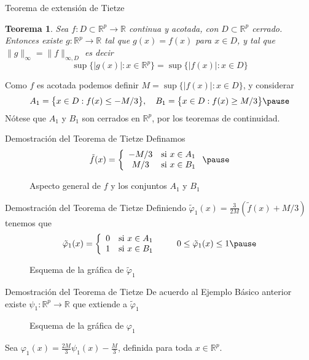\documentclass[xcolor=dvipsnames,10pt,handout, draft]{beamer}
\newcommand{\incfig}[1]{%
    \def\svgwidth{3.5in}
    {#1.pdf_tex}
}
\newcommand{\rz}{\mathbb R}
\newcommand{\rzp}{\mathbb R^{p}}
\newtheorem*{teo}{Teorema}
\begin{document}
\begin{frame}{Teorema de extensi\'on de Tietze}

\begin{teo}
Sea $f:D\subset\rzp\to\rz$ continua y acotada, con $D\subset\rzp$ cerrado. \pause Entonces existe $g:\rzp\to\rz$ tal que $g(x)=f(x)$ para $x\in D$, y tal que $\|g\|_{\infty}=\|f\|_{\infty,D}$ \pause es decir
$$\sup\big\{|g(x)|:x\in\rzp\big\}=\sup\big\{|f(x)|:x\in D\big\}$$
\end{teo}
\pause
Como $f$ es acotada podemos definir $M=\sup\big\{|f(x)|:x\in D\big\}$, \pause y considerar 
$$A_1=\big\{x\in D:f(x)\leq-M/3\big\},\quad B_1=\big\{x\in D:f(x)\geq M/3\big\}\pause$$
N\'otese que $A_1$ y $B_1$ son cerrados en $\rzp$, por los teoremas de continuidad.

\end{frame}



\begin{frame}{Demostraci\'on del Teorema de Tietze}
Definamos
$$\tilde f(x)=\left\{\begin{array}{cl}
					-M/3&\text{si }x\in A_1\\
					M/3&\text{si }x\in B_1
					\end{array}\right.\pause$$
\begin{figure}[ht]
    \centering
    \caption{Aspecto general de $f$ y los conjuntos $A_1$ y $B_1$}
\end{figure}

\end{frame}


\begin{frame}{Demostraci\'on del Teorema de Tietze}
Definiendo $\displaystyle\tilde\varphi_1(x)=\frac{3}{2M}\left(\tilde f(x)+M/3\right)$ tenemos que 
$$\tilde\varphi_1(x)=\left\{\begin{array}{ll}
					0&\text{si }x\in A_1\\
					1&\text{si }x\in B_1
					\end{array}\right.\qquad 0\leq\tilde\varphi_1(x)\leq1\pause$$
\begin{figure}[ht]
    \centering
    \caption{Esquema de la gr\'afica de $\tilde\varphi_1$}
\end{figure}

\end{frame}


\begin{frame}{Demostraci\'on del Teorema de Tietze}
De acuerdo al Ejemplo B\'asico anterior existe $\psi_1:\rzp\to\rz$ que extiende a $\tilde\varphi_1$
\begin{figure}[ht]
    \centering
    \caption{Esquema de la gr\'afica de $\varphi_1$}
\end{figure}
\pause
Sea $\displaystyle\varphi_1(x)=\frac{2M}{3}\psi_1(x)-\frac{M}{3}$, definida para toda $x\in\rzp$.
\end{frame}
\end{document}
